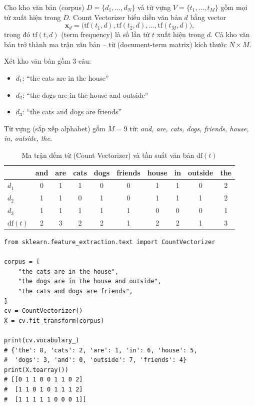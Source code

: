 \begin{definition}
Cho kho văn bản (corpus) $D = \{d_1, \dots, d_N\}$ và từ vựng $V = \{t_1, \dots, t_M\}$ gồm mọi từ xuất hiện trong $D$. Count Vectorizer biểu diễn văn bản $d$ bằng vector
\begin{equation}
    \mathbf{x}_d = \big(\mathrm{tf}(t_1, d), \mathrm{tf}(t_2, d), \dots, \mathrm{tf}(t_M, d)\big),
\end{equation}
trong đó $\mathrm{tf}(t, d)$ (term frequency) là số lần từ $t$ xuất hiện trong $d$. Cả kho văn bản trở thành ma trận văn bản -- từ (document-term matrix) kích thước $N \times M$.
\end{definition}

\begin{example}
Xét kho văn bản gồm 3 câu:
\begin{itemize}
    \item $d_1$: ``the cats are in the house''
    \item $d_2$: ``the dogs are in the house and outside''
    \item $d_3$: ``the cats and dogs are friends''
\end{itemize}
Từ vựng (sắp xếp alphabet) gồm $M = 9$ từ: \textit{and, are, cats, dogs, friends, house, in, outside, the}.
\end{example}

\begin{table}[H]
\centering
\begin{tabular}{|l|c|c|c|c|c|c|c|c|c|}
\hline
 & and & are & cats & dogs & friends & house & in & outside & the \\
\hline
$d_1$ & 0 & 1 & 1 & 0 & 0 & 1 & 1 & 0 & 2 \\ \hline
$d_2$ & 1 & 1 & 0 & 1 & 0 & 1 & 1 & 1 & 2 \\ \hline
$d_3$ & 1 & 1 & 1 & 1 & 1 & 0 & 0 & 0 & 1 \\ \hline
$\mathrm{df}(t)$ & 2 & 3 & 2 & 2 & 1 & 2 & 2 & 1 & 3 \\ \hline
\end{tabular}
\caption{Ma trận đếm từ (Count Vectorizer) và tần suất văn bản $\mathrm{df}(t)$}
\label{tab:count}
\end{table}

\begin{lstlisting}[caption={Count Vectorizer với scikit-learn}]
from sklearn.feature_extraction.text import CountVectorizer

corpus = [
    "the cats are in the house",
    "the dogs are in the house and outside",
    "the cats and dogs are friends",
]
cv = CountVectorizer()
X = cv.fit_transform(corpus)

print(cv.vocabulary_)
# {'the': 8, 'cats': 2, 'are': 1, 'in': 6, 'house': 5,
#  'dogs': 3, 'and': 0, 'outside': 7, 'friends': 4}
print(X.toarray())
# [[0 1 1 0 0 1 1 0 2]
#  [1 1 0 1 0 1 1 1 2]
#  [1 1 1 1 1 0 0 0 1]]
\end{lstlisting}


